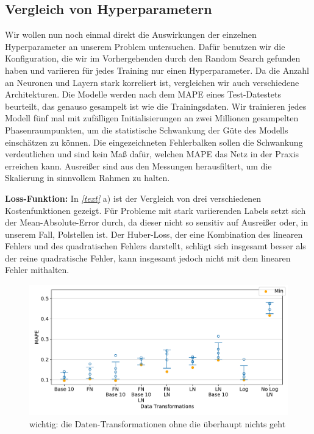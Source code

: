 \subsection{Vergleich von Hyperparametern}
Wir wollen nun noch einmal direkt die Auswirkungen der einzelnen Hyperparameter an unserem Problem untersuchen. Dafür benutzen wir die Konfiguration, die wir im Vorhergehenden durch den Random Search gefunden haben und variieren für jedes Training nur einen Hyperparameter. Da die Anzahl an Neuronen und Layern stark korreliert ist, vergleichen wir auch verschiedene Architekturen. Die Modelle werden nach dem MAPE eines Test-Datestets beurteilt, das genauso gesampelt ist wie die Trainingsdaten. Wir trainieren jedes Modell fünf mal mit zufälligen Initialisierungen an zwei Millionen gesampelten Phasenraumpunkten, um die statistische Schwankung der Güte des Modells einschätzen zu können. Die eingezeichneten Fehlerbalken sollen die Schwankung verdeutlichen und sind kein Maß dafür, welchen MAPE das Netz in der Praxis erreichen kann. Ausreißer sind aus den Messungen herausfiltert, um die Skalierung in sinnvollem Rahmen zu halten. 

\textbf{Loss-Funktion:}
In \textit{\autoref{text}} a) ist der Vergleich von drei verschiedenen Kostenfunktionen gezeigt. Für Probleme mit stark variierenden Labels setzt sich der Mean-Absolute-Error durch, da dieser nicht so sensitiv auf Ausreißer oder, in unserem Fall, Polstellen ist. Der Huber-Loss, der eine Kombination des linearen Fehlers und des quadratischen Fehlers darstellt, schlägt sich insgesamt besser als der reine quadratische Fehler, kann insgesamt jedoch nicht mit dem linearen Fehler mithalten. 
\begin{figure}[t!]
	\centering
	\includegraphics[width=14cm]{graphics/17,18}
	\caption{wichtig: die Daten-Transformationen ohne die überhaupt nichts geht}
	\label{besserjetzt}
\end{figure}

